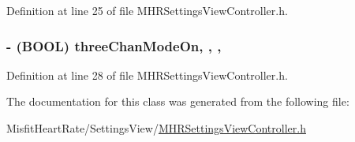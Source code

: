 Definition at line 25 of file M\+H\+R\+Settings\+View\+Controller.\+h.

\hypertarget{interface_m_h_r_settings_view_controller_add55937fcb10a424e5f651d372b4b6a9}{
\subsubsection[{three\+Chan\+Mode\+On}]{\setlength{\rightskip}{0pt plus 5cm}-\/ (B\+O\+O\+L) three\+Chan\+Mode\+On\hspace{0.3cm}{\ttfamily [read]}, {\ttfamily [write]}, {\ttfamily [nonatomic]}, {\ttfamily [assign]}}}\label{interface_m_h_r_settings_view_controller_add55937fcb10a424e5f651d372b4b6a9}


Definition at line 28 of file M\+H\+R\+Settings\+View\+Controller.\+h.



The documentation for this class was generated from the following file\+:\begin{DoxyCompactItemize}
\item 
Misfit\+Heart\+Rate/\+Settings\+View/\hyperlink{_m_h_r_settings_view_controller_8h}{M\+H\+R\+Settings\+View\+Controller.\+h}\end{DoxyCompactItemize}
